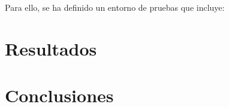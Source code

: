\documentclass[a4paper, 11pt]{article}
\begin{document}
Para ello, se ha definido un entorno de pruebas que incluye:

\par\vspace{0.4cm}





\clearpage

\section{Resultados}



\clearpage

\section{Conclusiones}



\clearpage
\end{document}
